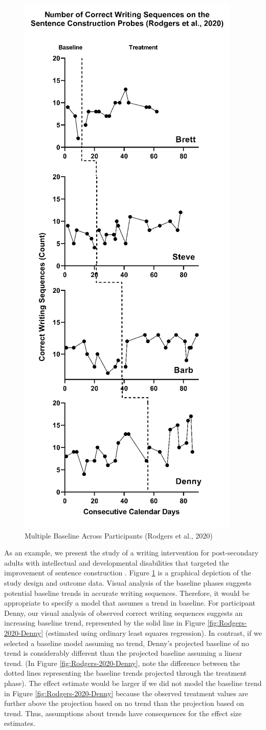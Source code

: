 \documentclass[
]{book}
\begin{document}
\begin{figure}
\includegraphics[width=0.5\linewidth]{images/Rodgers-2020} \caption{Multiple Baseline Across Participants (Rodgers et al., 2020)}\label{fig:Rodgers-2020}
\end{figure}

As an example, we present the study of a writing intervention for post-secondary adults with intellectual and developmental disabilities that targeted the improvement of sentence construction \citep{rodgers2021Effects}. Figure \ref{fig:Rodgers-2020} is a graphical depiction of the study design and outcome data. Visual analysis of the baseline phases suggests potential baseline trends in accurate writing sequences. Therefore, it would be appropriate to specify a model that assumes a trend in baseline.
For participant Denny, our visual analysis of observed correct writing sequences suggests an increasing baseline trend, represented by the solid line in Figure \ref{fig:Rodgers-2020-Denny} (estimated using ordinary least squares regression). In contrast, if we selected a baseline model assuming no trend, Denny's projected baseline of no trend is considerably different than the projected baseline assuming a linear trend. (In Figure \ref{fig:Rodgers-2020-Denny}, note the difference between the dotted lines representing the baseline trends projected through the treatment phase). The effect estimate would be larger if we did not model the baseline trend in Figure \ref{fig:Rodgers-2020-Denny} because the observed treatment values are further above the projection based on no trend than the projection based on trend. Thus, assumptions about trends have consequences for the effect size estimates.
\end{document}
